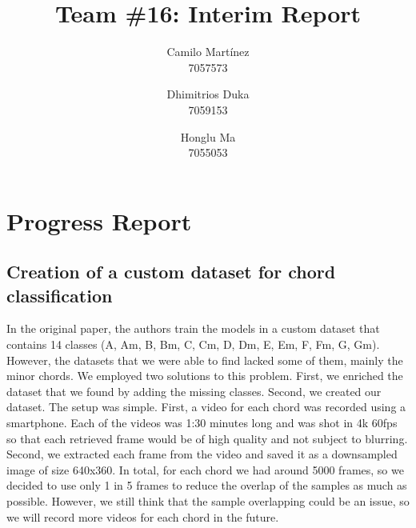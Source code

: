 \documentclass[10pt,twocolumn,letterpaper]{article}
\begin{document}
\title{Team \#16: Interim Report}

\author{
    Camilo Martínez\\
    7057573\\
    \and
    Dhimitrios Duka\\
    7059153\\
    \and
    Honglu Ma\\
    7055053\\
}
\maketitle

\section{Progress Report}


\subsection{Creation of a custom dataset for chord classification}
In the original paper, the authors train the models in a custom dataset that contains 14 classes (A, Am, B, Bm, C, Cm, D, Dm, E, Em, F, Fm, G, Gm). However, the datasets that we were able to find lacked some of them, mainly the minor chords. We employed two solutions to this problem. First, we enriched the dataset that we found by adding the missing classes. Second, we created our dataset. The setup was simple. First, a video for each chord was recorded using a smartphone. Each of the videos was 1:30 minutes long and was shot in 4k 60fps so that each retrieved frame would be of high quality and not subject to blurring. Second, we extracted each frame from the video and saved it as a downsampled image of size 640x360. In total, for each chord we had around 5000 frames, so we decided to use only 1 in 5 frames to reduce the overlap of the samples as much as possible. However, we still think that the sample overlapping could be an issue, so we will record more videos for each chord in the future.
\end{document}
